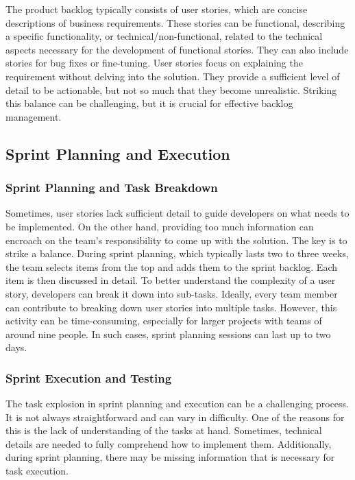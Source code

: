 The product backlog typically consists of user stories, which are
concise descriptions of business requirements. These stories can be
functional, describing a specific functionality, or
technical/non-functional, related to the technical aspects necessary for
the development of functional stories. They can also include stories for
bug fixes or fine-tuning. User stories focus on explaining the
requirement without delving into the solution. They provide a sufficient
level of detail to be actionable, but not so much that they become
unrealistic. Striking this balance can be challenging, but it is crucial
for effective backlog management.

\subsection{Sprint Planning and Execution}

\subsubsection{Sprint Planning and Task Breakdown}

Sometimes, user stories lack sufficient detail to guide developers on
what needs to be implemented. On the other hand, providing too much
information can encroach on the team's responsibility to come up with
the solution. The key is to strike a balance. During sprint planning,
which typically lasts two to three weeks, the team selects items from
the top and adds them to the sprint backlog. Each item is then discussed
in detail. To better understand the complexity of a user story,
developers can break it down into sub-tasks. Ideally, every team member
can contribute to breaking down user stories into multiple tasks.
However, this activity can be time-consuming, especially for larger
projects with teams of around nine people. In such cases, sprint
planning sessions can last up to two days.

\subsubsection{Sprint Execution and Testing}

The task explosion in sprint planning and execution can be a challenging
process. It is not always straightforward and can vary in difficulty.
One of the reasons for this is the lack of understanding of the tasks at
hand. Sometimes, technical details are needed to fully comprehend how to
implement them. Additionally, during sprint planning, there may be
missing information that is necessary for task execution.

